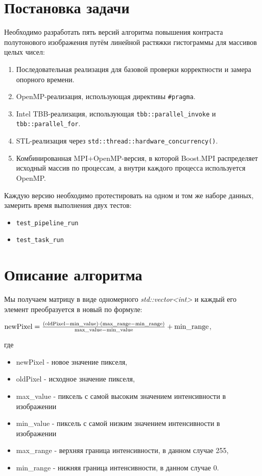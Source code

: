 \documentclass[a4paper,12pt]{article}
\begin{document}
\section{Постановка задачи}
\hspace*{1.25em}Необходимо разработать пять версий алгоритма повышения контраста полутонового изображения путём линейной растяжки гистограммы для массивов целых чисел:
\begin{enumerate}
    \item Последовательная реализация для базовой проверки корректности и замера опорного времени.
    \item OpenMP-реализация, использующая директивы \texttt{\#pragma}.
    \item Intel TBB-реализация, использующая \texttt{tbb::parallel\_invoke} и \texttt{tbb::parallel\_for}.
    \item STL-реализация через \texttt{std::thread::hardware\_concurrency()}.
    \item Комбинированная MPI+OpenMP-версия, в которой Boost.MPI распределяет исходный массив по процессам, а внутри каждого процесса используется OpenMP.
\end{enumerate}

\hspace*{1.25em}Каждую версию необходимо протестировать на одном и том же наборе данных, замерить время выполнения двух тестов:
\begin{itemize}
    \item \texttt{test\_pipeline\_run}
    \item \texttt{test\_task\_run}
\end{itemize}
\newpage


\section{Описание алгоритма}
Мы получаем матрицу в виде одномерного \textit{std::vector<int>} и каждый его элемент преобразуется в новый по формуле:
\begin{center} 
{\Large 
$
\text{\normalsize newPixel} = \frac{(\text{oldPixel} - \text{min\_value}) \cdot 
(\text{max\_range} - \text{min\_range})}{\text{max\_value} - \text{min\_value}} + \text{\normalsize min\_range}
$, 
}
\end{center}
где \begin{itemize}
  \item newPixel - новое значение пикселя,
  \item oldPixel - исходное значение пикселя,
  \item max\_value - пиксель с самой высоким значением интенсивности в изображении
  \item min\_value - пиксель с самой низким значением интенсивности в изображении
  \item max\_range - верхняя граница интенсивности, в данном случае 255,
  \item min\_range - нижняя граница интенсивности, в данном случае 0.
\end{itemize}
\newpage
\end{document}

